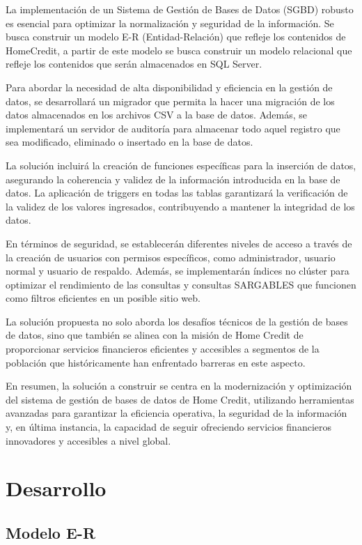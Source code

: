La implementación de un Sistema de Gestión de Bases de Datos (SGBD) robusto es
esencial para optimizar la normalización y seguridad de la información.
Se busca construir un modelo E-R (Entidad-Relación) que refleje los contenidos de HomeCredit, 
a partir de este modelo se busca construir un modelo relacional que refleje los contenidos 
que serán almacenados en SQL Server.

Para abordar la necesidad de alta disponibilidad y eficiencia en la gestión de
datos, se desarrollará un migrador que permita la hacer una migración de los 
datos almacenados en los archivos CSV a la base de datos. Además, se
implementará un servidor de auditoría para almacenar todo aquel registro que
sea modificado, eliminado o insertado en la base de datos.

La solución incluirá la creación de funciones específicas para la inserción de
datos, asegurando la coherencia y validez de la información introducida en la
base de datos. La aplicación de triggers en todas las tablas garantizará la
verificación de la validez de los valores ingresados, contribuyendo a mantener
la integridad de los datos.

En términos de seguridad, se establecerán diferentes niveles de acceso a través
de la creación de usuarios con permisos específicos, como administrador, usuario
normal y usuario de respaldo. Además, se implementarán índices no clúster para
optimizar el rendimiento de las consultas y consultas SARGABLES que funcionen
como filtros eficientes en un posible sitio web.

La solución propuesta no solo aborda los desafíos técnicos de la gestión de
bases de datos, sino que también se alinea con la misión de Home Credit de
proporcionar servicios financieros eficientes y accesibles a segmentos de la
población que históricamente han enfrentado barreras en este aspecto.

En resumen, la solución a construir se centra en la modernización y optimización
del sistema de gestión de bases de datos de Home Credit, utilizando herramientas
avanzadas para garantizar la eficiencia operativa, la seguridad de la
información y, en última instancia, la capacidad de seguir ofreciendo servicios
financieros innovadores y accesibles a nivel global.

\section{Desarrollo}

\subsection{Modelo E-R}

